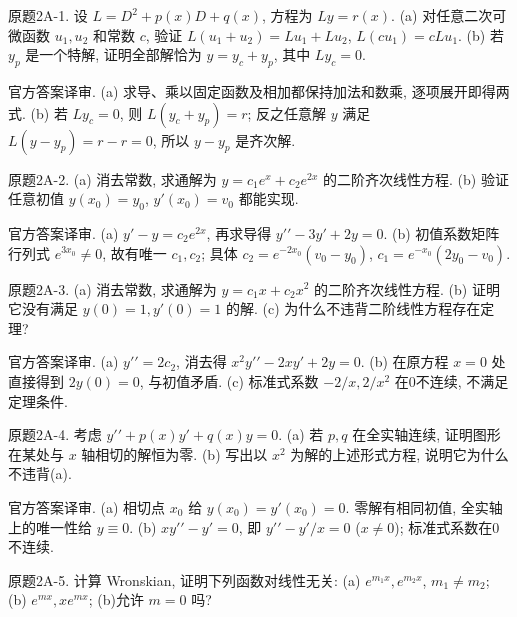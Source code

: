 \begin{exercise}\label{cw:bank-2A-1}
原题2A-1. 设 $L=D^2+p(x)D+q(x)$, 方程为 $Ly=r(x)$. (a) 对任意二次可微函数 $u_1,u_2$ 和常数 $c$, 验证 $L(u_1+u_2)=Lu_1+Lu_2$, $L(cu_1)=cLu_1$. (b) 若 $y_p$ 是一个特解, 证明全部解恰为 $y=y_c+y_p$, 其中 $Ly_c=0$.
\end{exercise}
\begin{solution}
官方答案译审. (a) 求导、乘以固定函数及相加都保持加法和数乘, 逐项展开即得两式. (b) 若 $Ly_c=0$, 则 $L(y_c+y_p)=r$; 反之任意解 $y$ 满足 $L(y-y_p)=r-r=0$, 所以 $y-y_p$ 是齐次解.
\end{solution}
\begin{exercise}\label{cw:bank-2A-2}
原题2A-2. (a) 消去常数, 求通解为 $y=c_1e^x+c_2e^{2x}$ 的二阶齐次线性方程. (b) 验证任意初值 $y(x_0)=y_0$, $y\prime(x_0)=v_0$ 都能实现.
\end{exercise}
\begin{solution}
官方答案译审. (a) $y\prime-y=c_2e^{2x}$, 再求导得 $y\prime\prime-3y\prime+2y=0$. (b) 初值系数矩阵行列式 $e^{3x_0}\ne0$, 故有唯一 $c_1,c_2$; 具体 $c_2=e^{-2x_0}(v_0-y_0)$, $c_1=e^{-x_0}(2y_0-v_0)$.
\end{solution}
\begin{exercise}\label{cw:bank-2A-3}
原题2A-3. (a) 消去常数, 求通解为 $y=c_1x+c_2x^2$ 的二阶齐次线性方程. (b) 证明它没有满足 $y(0)=1,y\prime(0)=1$ 的解. (c) 为什么不违背二阶线性方程存在定理?
\end{exercise}
\begin{solution}
官方答案译审. (a) $y\prime\prime=2c_2$, 消去得 $x^2y\prime\prime-2xy\prime+2y=0$. (b) 在原方程 $x=0$ 处直接得到 $2y(0)=0$, 与初值矛盾. (c) 标准式系数 $-2/x,2/x^2$ 在0不连续, 不满足定理条件.
\end{solution}
\begin{exercise}\label{cw:bank-2A-4}
原题2A-4. 考虑 $y\prime\prime+p(x)y\prime+q(x)y=0$. (a) 若 $p,q$ 在全实轴连续, 证明图形在某处与 $x$ 轴相切的解恒为零. (b) 写出以 $x^2$ 为解的上述形式方程, 说明它为什么不违背(a).
\end{exercise}
\begin{solution}
官方答案译审. (a) 相切点 $x_0$ 给 $y(x_0)=y\prime(x_0)=0$. 零解有相同初值, 全实轴上的唯一性给 $y\equiv0$. (b) $xy\prime\prime-y\prime=0$, 即 $y\prime\prime-y\prime/x=0$ ($x\ne0$); 标准式系数在0不连续.
\end{solution}
\begin{exercise}\label{cw:bank-2A-5}
原题2A-5. 计算 Wronskian, 证明下列函数对线性无关: (a) $e^{m_1x},e^{m_2x}$, $m_1\ne m_2$; (b) $e^{mx},xe^{mx}$; (b)允许 $m=0$ 吗?
\end{exercise}
